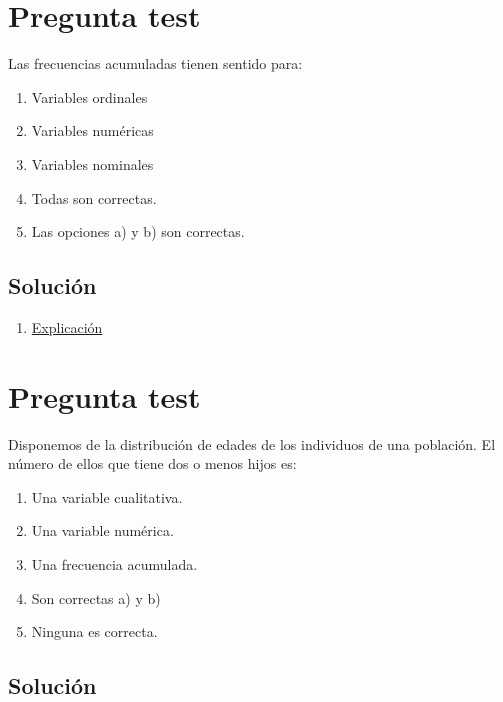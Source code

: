\documentclass[
]{book}
\providecommand{\tightlist}{%
  \setlength{\itemsep}{0pt}\setlength{\parskip}{0pt}}
\begin{document}
\hypertarget{pregunta-test-15}{%
\section{Pregunta test}\label{pregunta-test-15}}

Las frecuencias acumuladas tienen sentido para:

\begin{enumerate}
\def\labelenumi{\alph{enumi})}
\tightlist
\item
  Variables ordinales
\item
  Variables numéricas
\item
  Variables nominales
\item
  Todas son correctas.
\item
  Las opciones a) y b) son correctas.
\end{enumerate}

\hypertarget{soluciuxf3n-15}{%
\subsection{Solución}\label{soluciuxf3n-15}}

\begin{enumerate}
\def\labelenumi{\alph{enumi})}
\setcounter{enumi}{4}
\tightlist
\item
  \href{https://1fjmanzano.github.io/bioestadistica/tablas-de-frecuencias.html}{Explicación}
\end{enumerate}

\hypertarget{pregunta-test-16}{%
\section{Pregunta test}\label{pregunta-test-16}}

Disponemos de la distribución de edades de los individuos de una población. El número de ellos que tiene dos o menos hijos es:

\begin{enumerate}
\def\labelenumi{\alph{enumi})}
\tightlist
\item
  Una variable cualitativa.
\item
  Una variable numérica.
\item
  Una frecuencia acumulada.
\item
  Son correctas a) y b)
\item
  Ninguna es correcta.
\end{enumerate}

\hypertarget{soluciuxf3n-16}{%
\subsection{Solución}\label{soluciuxf3n-16}}
\end{document}

